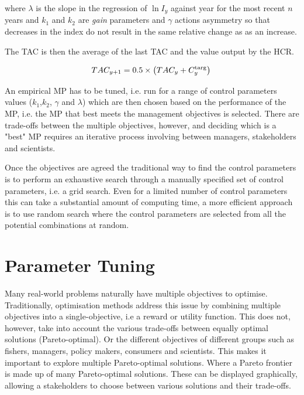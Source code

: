 \documentclass[12pt,doublespacing,a4paper]{ouparticle}
\begin{document}
where $\lambda$ is the slope in the regression of $\ln I_y$ against year for the most recent $n$ years and $k_1$ and $k_2$ are \textit{gain} parameters and $\gamma$ actions asymmetry so that decreases in the index do not result in the same relative change as as an increase.

The TAC is then the average of the last TAC and the value output by the HCR. 

\begin{equation} 
     TAC_{y+1} = 0.5\times\left(TAC_y+C^{\rm targ}_y\right)\\
\end{equation}

An empirical MP has to be tuned, i.e. run for a range of control parameters values ($k_1$,$k_2$, $\gamma$ and $\lambda$) which are then chosen based on the performance of the MP, i.e. the MP that best meets the management objectives is selected. There are trade-offs between the multiple objectives, however, and  deciding which is a "best" MP requires an iterative process involving between managers, stakeholders and scientists.  

Once the objectives are agreed the traditional way to find the control parameters is to perform an exhaustive search through a manually specified set of control parameters, i.e. a grid search. Even for a limited number of control parameters this can take a substantial amount of computing time, a more efficient approach is to use random search where the control parameters are selected from all the potential combinations at random.

\section{Parameter Tuning}

Many real-world problems naturally have multiple objectives to optimise. Traditionally, optimisation methods address this issue by combining multiple objectives into a single-objective, i.e a reward or utility function. This does not, however, take into account the various trade-offs between equally optimal solutions (Pareto-optimal). Or the different objectives of different groups such as fishers, managers, policy makers, consumers and scientists. This makes it important to explore multiple Pareto-optimal solutions. Where a Pareto frontier is made up of many Pareto-optimal solutions. These can be displayed graphically, allowing a stakeholders to choose between various solutions and their trade-offs.
\end{document}
